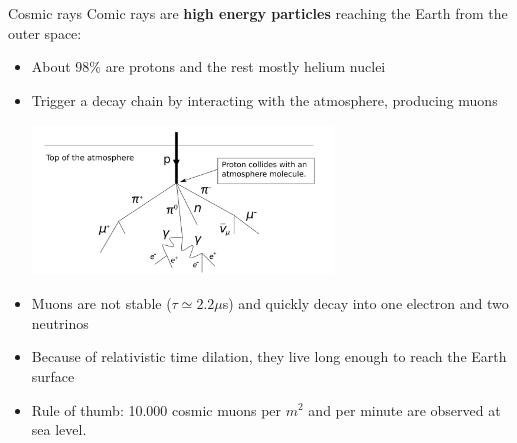 \documentclass[8 pt]{beamer}
\begin{document}
\begin{frame}{Cosmic rays}
\justifying
Comic rays are \textbf{high energy particles} reaching the Earth from the outer space:
\begin{itemize}
	\justifying
	\item About 98\% are protons and the rest mostly helium nuclei
	\item Trigger a decay chain by interacting with the atmosphere, producing muons

	\begin{minipage}[c]{.98\textwidth}
	\begin{center}
	\includegraphics[width=8cm, height=4cm]{figs/cosmic.png}
	\end{center}
\end{minipage} \hfill 
	
	\item Muons are not stable ($\tau \simeq 2.2\mu$s) and quickly decay into one electron and two neutrinos
	\item Because of relativistic time dilation, they live long enough to reach the Earth surface
	\item Rule of thumb: 10.000 cosmic muons per $m^2$ and per minute are observed at sea level.
\end{itemize} \vfill

\end{frame}
\end{document}
